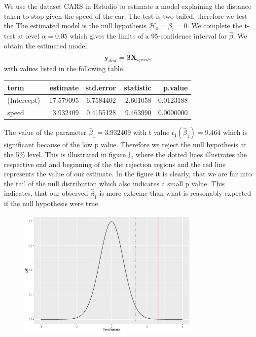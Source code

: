 \begin{example} 
We use the dataset CARS in Rstudio to estimate a model explaining the distance taken to stop given the speed of the car. The test is two-tailed, therefore we test the The estimated model is the null hypothesis $\mathcal{H}_0=\beta_1=0.$
We complete the t-test at level $\alpha=0.05$ which gives the limits of a 95-confidence interval for $\hat{\beta}$.
We obtain the estimated model
\begin{align*}
    \textbf{y}_{dist} = \hat{\boldsymbol{\beta}} \boldsymbol{X}_{speed},
\end{align*}
with values listed in the following table.

\begin{table}[H]
\centering
\begin{tabular}{lrrrr}
\toprule
\textbf{term} & \textbf{estimate} & \textbf{std.error} & \textbf{statistic} & \textbf{p.value}\\
\midrule
(Intercept) & -17.579095 & 6.7584402 & -2.601058 & 0.0123188\\
speed & 3.932409 & 0.4155128 & 9.463990 & 0.0000000\\
\bottomrule
\end{tabular}
\end{table}

The value of the parameter $\hat{\beta}_1=3.932409$ with t value $t_1(\hat{\beta}_1) = 9.464$ which is significant because of the low p value. 
Therefore we reject the null hypothesis at the 5\% level. 
This is illustrated in figure \ref{fig:t_distributionplot1}, where the dotted lines illustrates the respective end and beginning of the the rejection regions and the red line represents the value of our estimate. 
In the figure it is clearly, that we are far into the tail of the null distribution which also indicates a small p value. 
This indicates, that our observed $\hat{\beta}_1$ is more extreme than what is reasonably expected if the null hypothesis were true.

\begin{figure}[H]
    \centering
    \includegraphics[width = 0.8\textwidth]{figures/Nanna/t_distributionplot.pdf}
    \caption{}
    \label{fig:t_distributionplot1}
\end{figure}


\end{example}
